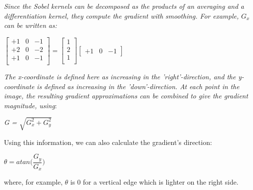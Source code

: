 \emph{\color{blue}Since the Sobel kernels can be decomposed as the products of an averaging and a differentiation kernel, they compute the gradient with smoothing. For example, \textbf{$G_{x}$}  can be written as:}

\begin{center}
$  \begin{bmatrix}
	+1 & 0 & -1 \\
	+2 & 0 & -2 \\
	+1 & 0 & -1 \\
   \end{bmatrix} =  \begin{bmatrix}
	1 \\
	2 \\
	1 \\
  \end{bmatrix} \begin{bmatrix}
	+1 & 0 & -1
  \end{bmatrix}
$
\end{center}


\emph{\color{blue}The x-coordinate is defined here as increasing in the 'right'-direction, and the y-coordinate is defined as increasing in the 'down'-direction. At each point in the image, the resulting gradient approximations can be combined to give the gradient magnitude, using\cite{SobelOperatorandCannyEdgeDetector}}:

\begin{center}
\emph{\color{green}G = $\sqrt{ G_{x}^{2} + G_{y}^{2} }$}
\end{center}

Using this information, we can also calculate the gradient's direction\cite{SobelOperatorandCannyEdgeDetector}:

\begin{center}
$\theta = atan\bigg(\dfrac{G_{y}}{G_{x}}\bigg)$
\end{center}

where, for example, $\theta$ is 0 for a vertical edge which is lighter on the right side.


